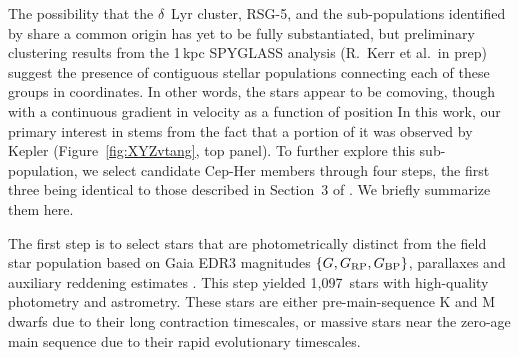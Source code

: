 \documentclass[12pt,twocolumn,tighten,linenumbers]{aastex63}
\newcommand{\npms}{1{,}097} %
\begin{document}
The possibility that the $\delta$~Lyr cluster, RSG-5, and the
sub-populations identified by \citet{Kerr2021} share a common origin
has yet to be fully substantiated, but preliminary clustering results
from the 1\,kpc SPYGLASS analysis (R.~Kerr et al.\ in prep) suggest
the presence of contiguous stellar populations connecting each of
these groups in  coordinates.  In other words, the stars
appear to be comoving, though with a continuous gradient in velocity
as a function of position
In this work, our primary interest in  stems
from the fact that a portion of it was observed by Kepler
(Figure~\ref{fig:XYZvtang}, top panel).  To further explore this
sub-population, we select candidate Cep-Her members through four
steps, the first three being identical to those described in Section~3
of \citet{Kerr2021}.  We briefly summarize them here.

The first step is to select stars that are photometrically distinct
from the field star population based on Gaia EDR3 magnitudes $\{G,
G_{\rm RP}, G_{\rm BP}\}$, parallaxes and auxiliary reddening
estimates \citep{lallement_gaia-2mass_2019}.  This step yielded \npms\
stars with high-quality photometry and astrometry.  These stars are
either pre-main-sequence K and M dwarfs due to their long contraction
timescales, or massive stars near the zero-age main sequence due to
their rapid evolutionary timescales.
\end{document}
